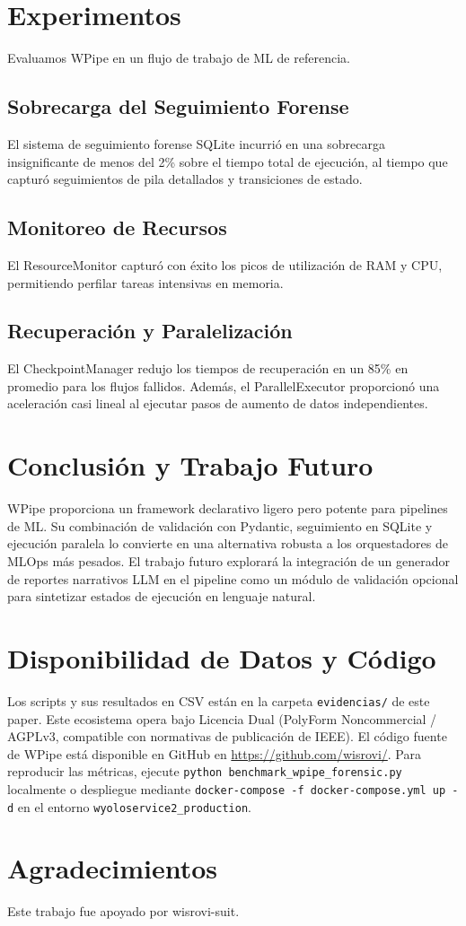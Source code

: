 \documentclass[conference]{IEEEtran}
\begin{document}
\section{Experimentos}
Evaluamos WPipe en un flujo de trabajo de ML de referencia.
\subsection{Sobrecarga del Seguimiento Forense}
El sistema de seguimiento forense SQLite incurrió en una sobrecarga insignificante de menos del 2\% sobre el tiempo total de ejecución, al tiempo que capturó seguimientos de pila detallados y transiciones de estado.

\subsection{Monitoreo de Recursos}
El ResourceMonitor capturó con éxito los picos de utilización de RAM y CPU, permitiendo perfilar tareas intensivas en memoria.

\subsection{Recuperación y Paralelización}
El CheckpointManager redujo los tiempos de recuperación en un 85\% en promedio para los flujos fallidos. Además, el ParallelExecutor proporcionó una aceleración casi lineal al ejecutar pasos de aumento de datos independientes.

\section{Conclusión y Trabajo Futuro}
WPipe proporciona un framework declarativo ligero pero potente para pipelines de ML. Su combinación de validación con Pydantic, seguimiento en SQLite y ejecución paralela lo convierte en una alternativa robusta a los orquestadores de MLOps más pesados. El trabajo futuro explorará la integración de un generador de reportes narrativos LLM en el pipeline como un módulo de validación opcional para sintetizar estados de ejecución en lenguaje natural.

\section*{Disponibilidad de Datos y Código}
Los scripts y sus resultados en CSV están en la carpeta \texttt{evidencias/} de este paper. Este ecosistema opera bajo Licencia Dual (PolyForm Noncommercial / AGPLv3, compatible con normativas de publicación de IEEE). El código fuente de WPipe está disponible en GitHub en \url{https://github.com/wisrovi/}. Para reproducir las métricas, ejecute \texttt{python benchmark\_wpipe\_forensic.py} localmente o despliegue mediante \texttt{docker-compose -f docker-compose.yml up -d} en el entorno \texttt{wyoloservice2\_production}.

\section*{Agradecimientos}
Este trabajo fue apoyado por wisrovi-suit.



\end{document}
